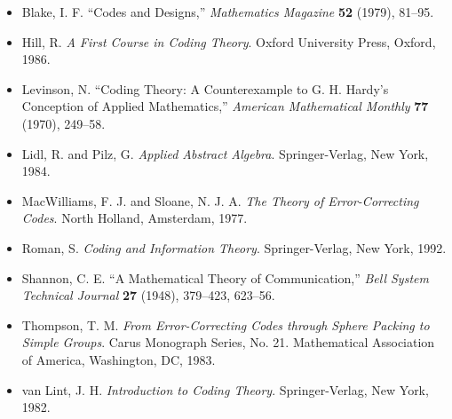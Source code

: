 {\small
\begin{itemize}
 
\item[{\bf [1]}]
Blake, I. F. ``Codes and Designs,'' {\it Mathematics Magazine} {\bf
52} (1979), 81--95. 
 
\item[{\bf [2]}]
Hill, R. {\it A First Course in Coding Theory}. Oxford University
Press, Oxford, 1986. 
 
\item[{\bf [3]}]
Levinson, N. ``Coding Theory: A Counterexample to G. H. Hardy's
Conception of Applied Mathematics,'' {\it American Mathematical
Monthly} {\bf 77} (1970), 249--58. 
 
\item[{ \bf [4]}]
Lidl, R. and Pilz, G. {\it Applied Abstract Algebra}. Springer-Verlag,
New York, 1984. 
 
\item[{\bf [5]}]
MacWilliams, F. J. and Sloane, N. J. A. {\it The Theory of
Error-Correcting Codes}. North Holland, Amsterdam, 1977. 
 
 
\item[{\bf [6]}]
Roman, S. {\it Coding and Information Theory}. Springer-Verlag,
New York, 1992. 
 
 
\item[{\bf [7]}]
Shannon, C. E. ``A Mathematical Theory of Communication,'' {\it Bell
System Technical Journal} {\bf 27} (1948), 379--423, 623--56.
 
\item[{\bf [8]}]
Thompson, T. M. {\it From Error-Correcting Codes through Sphere
Packing to Simple Groups}. Carus Monograph Series, No. 21. Mathematical
Association of America, Washington, DC, 1983. 
 
\item[{\bf [9]}]
van Lint, J. H. {\it Introduction to Coding Theory}. Springer-Verlag,
New York, 1982. 
 
\end{itemize}
}
